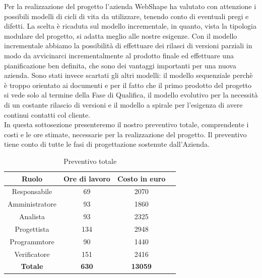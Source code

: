 Per la realizzazione del progetto l'azienda WebShape ha valutato con attenzione i possibili modelli di cicli di vita da utilizzare, tenendo conto di eventuali pregi e difetti. 
La scelta \`e ricaduta sul modello incrementale, in quanto, vista la tipologia modulare del progetto, si adatta meglio alle nostre esigenze. Con il modello incrementale abbiamo la possibilit\`a di effettuare dei rilasci di versioni parziali in modo da avvicinarci incrementalmente al prodotto finale ed effettuare una pianificazione ben definita, che sono dei vantaggi importanti per una nuova azienda. Sono stati invece scartati gli altri modelli: il modello sequenziale perch\`e \`e troppo orientato ai documenti e per il fatto che il primo prodotto del progetto si vede solo al termine della Fase di Qualifica, il modello evolutivo per la necessit\`a di un costante rilascio di versioni e il modello a spirale per l'esigenza di avere continui contatti col cliente.\\
In questa sottosezione presenteremo il nostro preventivo totale, comprendente i costi e le ore stimate, necessarie per la realizzazione del progetto. Il preventivo tiene conto di tutte le fasi di progettazione sostenute dall'Azienda.

\begin{table}[h]
	\begin{center}
		  \begin{tabular}{|c|c|c|c|}
		 \hline 
		 \textbf{Ruolo} & \textbf{Ore di lavoro} & \textbf{Costo in euro}\\
		 \hline
		Responsabile & 69 & 2070 \\
		Amministratore & 93 & 1860\\
		Analista & 93 & 2325\\
		Progettista & 134 & 2948\\
		Programmtore & 90 & 1440 \\
		Verificatore & 151 & 2416\\
        \hline
        \textbf{Totale} & \textbf{630} & \textbf{13059}\\
		\hline
		\end{tabular}
	\caption{Preventivo totale} 
	\label{tab:tabella_preventivo}
	\end{center}	
\end{table}


